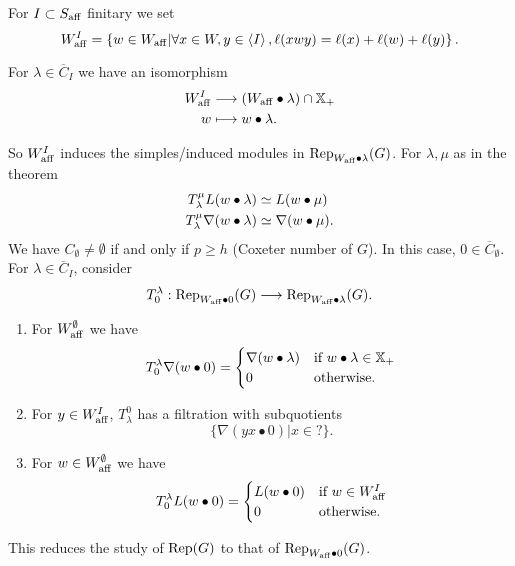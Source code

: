 For $I\subset S_{\mathrm{aff}}$ finitary we set
\[
W_{\mathrm{aff}}^{I} = \left\{ w\in W_{\mathrm{aff}} \middle| \forall x\in W,y\in \left<I \right>, \ell(xwy) = \ell(x)+\ell(w)+\ell(y) \right\} .
\] 
\begin{fact}
	For $\lambda\in \overline{C}_I$ we have an isomorphism
	\begin{align*}
		W_{\mathrm{aff}}^{I} &\longrightarrow (W_{\mathrm{aff}}\bullet\lambda)\cap \mathbb{X}_+ \\
		w &\longmapsto w\bullet\lambda.
	\end{align*}
\end{fact}
So $W_{\mathrm{aff}}^{I}$ induces the simples/induced modules in $\operatorname{Rep}_{W_{\mathrm{aff}}\bullet\lambda}(G)$. For $\lambda,\mu$ as in the theorem
\begin{align*}
	T_{\lambda}^{\mu}L(w\bullet\lambda) &\simeq L(w\bullet\mu) \\
	T_{\lambda}^{\mu}\nabla(w\bullet\lambda) &\simeq \nabla(w\bullet\mu).
\end{align*}
We have $C_{\emptyset}\neq \emptyset$ if and only if $p\ge h$ (Coxeter number of $G$). In this case, $0\in \overline{C}_{\emptyset}$. For $\lambda\in \overline{C}_I$, consider
\[
T_0^{\lambda}:\Rep_{W\aff\bullet 0}(G) \to \Rep_{W\aff\bullet\lambda}(G).
\] 
\begin{proposition}\leavevmode
	\begin{enumerate}[(1)]
		\item For $W_{\mathrm{aff}}^{\emptyset}$ we have
			\[
			T_0^{\lambda}\nabla(w\bullet 0) = \begin{cases}
				\nabla(w\bullet\lambda) & \text{if }w\bullet\lambda\in \mathbb{X}_+ \\
				0 & \text{otherwise}.
			\end{cases}
			\] 
		\item For $y\in W_{\mathrm{aff}}^{I}$, $T_\lambda^{0}$ has a filtration with subquotients
			\[
			\{\nabla(yx\bullet 0)| x\in ?\} .
			\] 
		\item For $w\in W_{\mathrm{aff}}^{\emptyset}$ we have
			\[
			T_0^{\lambda}L(w\bullet 0) = \begin{cases}
				L(w\bullet 0) & \text{if }w\in W_{\mathrm{aff}}^{I} \\
				0 & \text{otherwise}.
			\end{cases}
			\] 
	\end{enumerate}
\end{proposition}
This reduces the study of $\operatorname{Rep}(G)$ to that of $\operatorname{Rep}_{W_{\mathrm{aff}}\bullet 0}(G)$.


